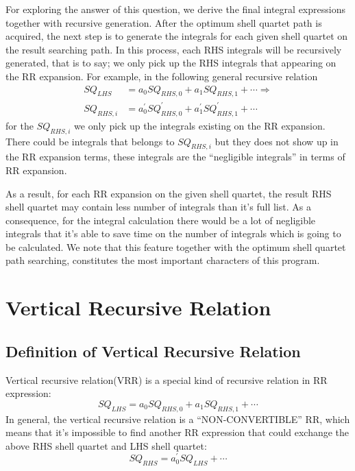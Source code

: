 For exploring the answer of this question, we derive the final 
integral expressions together with recursive generation. After 
the optimum shell quartet path is acquired, the next step is to
generate the integrals for each given shell quartet on the result
searching path. In this process, each RHS integrals will be 
recursively generated, that is to say; we only pick up the RHS
integrals that appearing on the RR expansion. For example, in 
the following general recursive relation
\begin{align}
 SQ_{LHS}  &= a_{0}SQ_{RHS,0} + a_{1}SQ_{RHS,1} + \cdots \Rightarrow \nonumber \\
 SQ_{RHS,i} &= a^{'}_{0}SQ^{'}_{RHS,0} + a^{'}_{1}SQ^{'}_{RHS,1} + \cdots
\end{align}
for the $SQ_{RHS,i}$ we only pick up the integrals existing on the RR 
expansion. There could be integrals that belongs to $SQ_{RHS,i}$ but 
they does not show up in the RR expansion terms, these integrals
are the ``negligible integrals'' in terms of RR expansion. 

As a result, for each RR expansion on the given shell quartet, the 
result RHS shell quartet may contain less number of integrals than
it's full list. As a consequence, for the integral calculation 
there would be a lot of negligible integrals that it's able to save 
time on the number of integrals which is going to be calculated. 
We note that this feature together with the optimum shell quartet 
path searching, constitutes the most important characters of this 
program.

\section{Vertical Recursive Relation}
%
%
\subsection{Definition of Vertical Recursive Relation}
%
%
\label{vrr}
Vertical recursive relation(VRR) is a special kind of recursive relation
in RR expression:
\begin{equation}
 SQ_{LHS}  = a_{0}SQ_{RHS,0} + a_{1}SQ_{RHS,1} + \cdots
\end{equation}
In general, the vertical recursive relation is a ``NON-CONVERTIBLE''
RR, which means that it's impossible to find another RR expression that could 
exchange the above RHS shell quartet and LHS shell quartet:
\begin{equation}
 SQ_{RHS} = a_{0}^{'}SQ_{LHS} + \cdots
\end{equation}

